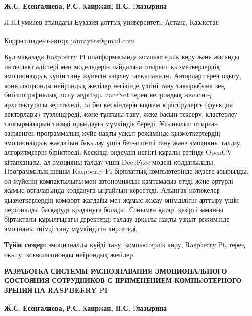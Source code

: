 
\begin{articleheader}

{\bfseries
Ж.С. Есенгалиева\textsuperscript{\envelope },
Р.С. Каиржан,
Н.С. Глазырина
}
\end{articleheader}
\vspace{0.3em}
\begin{affiliation}
Л.Н.Гумилев атындағы Еуразия ұлттық университеті, Астана, Қазақстан

\raggedright \textsuperscript{\envelope }Корреспондент-автор: jannayess@gmail.com
\end{affiliation}

Бұл мақалада Raspberry Pi платформасында компьютерлік көру және жасанды
интеллект әдістері мен модельдерін пайдалана отырып, қызметкерлердің
эмоционалдық күйін тану жүйесін әзірлеу талқыланады. Авторлар терең
оқыту, конволюционды нейрондық желілер негізінде үлгіні тану тақырыбына
кең библиографиялық шолу жүргізді. FaceNet терең нейрондық желісінің
архитектурасы зерттеледі, ол бет кескіндерін ықшам кірістірулерге
(функция векторлары) түрлендіреді, және тұлғаны тану, жеке басын
тексеру, кластерлеу тапсырмаларын тиімді орындауға мүмкіндік береді.
Ұсынылып отырған әзірленген программалық жүйе нақты уақыт режимінде
қызметкерлердің эмоционалдық жағдайын бақылау үшін бет-әлпетті тану және
эмоцияны талдау алгоритмдерін біріктіреді. Кескінді өңдеудің негізгі
құралы ретінде OpenCV кітапханасы, ал эмоцияны талдау үшін DeepFace
моделі қолданылады. Программалық шешім Raspberry Pi бірплаттық
компьютерінде жүзеге асырылды, ол жүйенің компактылығы мен автономиясын
қамтамасыз етеді және әртүрлі жұмыс орталарында қолдануға ыңғайлын
көрсетеді. Алынған нәтижелер қызметкерлердің комфорт жағдайы мен жұмыс
жасау өнімділігін арттыру үшін персоналды басқаруда қолдануға болады.
Сонымен қатар, қазіргі заманғы біртақталы құрылғыдағы деректерді талдау
арқылы нақты уақыт режимінде эмоцияны тиімді тану мүмкіндігін көрсетеді.

{\bfseries Түйін сөздер:} эмоционалды күйді тану, компьютерлік көру,
Raspberry Pi, терең оқыту, конволюционды нейрондық желілер.

\begin{articleheader}
{\bfseries РАЗРАБОТКА СИСТЕМЫ РАСПОЗНАВАНИЯ ЭМОЦИОНАЛЬНОГО СОСТОЯНИЯ
СОТРУДНИКОВ С ПРИМЕНЕНИЕМ КОМПЬЮТЕРНОГО ЗРЕНИЯ НА RASPBERRY PI}

{\bfseries
Ж.С. Есенгалиева\textsuperscript{\envelope },
Р.С. Каиржан,
Н.С. Глазырина
}
\end{articleheader}

